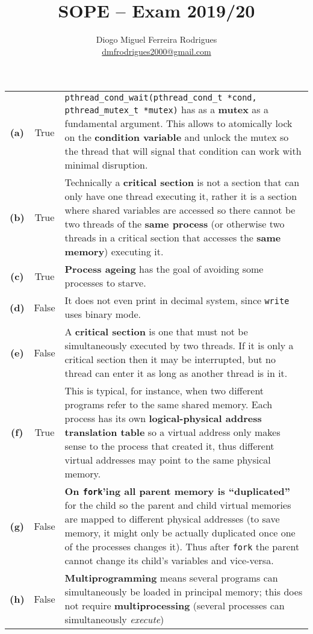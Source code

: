 \documentclass{sope}
\title{SOPE -- Exam 2019/20}
\author{Diogo Miguel Ferreira Rodrigues \\ \href{mailto:dmfrodrigues2000@gmail.com}{dmfrodrigues2000@gmail.com}}
\begin{document}
\renewcommand{\thesubsection}{\thesection\alph{subsection}}
\setcounter{chapter}{19}
\begin{center}    
    \begin{longtable}{c | c p{132mm}}
        \textbf{(a)} & True & \texttt{pthread\_cond\_wait(pthread\_cond\_t *cond, pthread\_mutex\_t *mutex)} has as a \textbf{mutex} as a fundamental argument. This allows to atomically lock on the \textbf{condition variable} and unlock the mutex so the thread that will signal that condition can work with minimal disruption. \\
        \textbf{(b)} & True & Technically a \textbf{critical section} is not a section that can only have one thread executing it, rather it is a section where shared variables are accessed so there cannot be two threads of the \textbf{same process} (or otherwise two threads in a critical section that accesses the \textbf{same memory}) executing it. \\
        \textbf{(c)} & True & \textbf{Process ageing} has the goal of avoiding some processes to starve. \\
        \textbf{(d)} & False & It does not even print in decimal system, since \texttt{write} uses binary mode. \\
        \textbf{(e)} & False & A \textbf{critical section} is one that must not be simultaneously executed by two threads. If it is only a critical section then it may be interrupted, but no thread can enter it as long as another thread is in it. \\
        \textbf{(f)} & True & This is typical, for instance, when two different programs refer to the same shared memory. Each process has its own \textbf{logical-physical address translation table} so a virtual address only makes sense to the process that created it, thus different virtual addresses may point to the same physical memory. \\
        \textbf{(g)} & False & \textbf{On \texttt{fork}'ing all parent memory is ``duplicated''} for the child so the parent and child virtual memories are mapped to different physical addresses (to save memory, it might only be actually duplicated once one of the processes changes it). Thus after \texttt{fork} the parent cannot change its child's variables and vice-versa. \\
        \textbf{(h)} & False & \textbf{Multiprogramming} means several programs can simultaneously be loaded in principal memory; this does not require \textbf{multiprocessing} (several processes can simultaneously \textit{execute})\\

\end{longtable}
\end{center}
\end{document}
